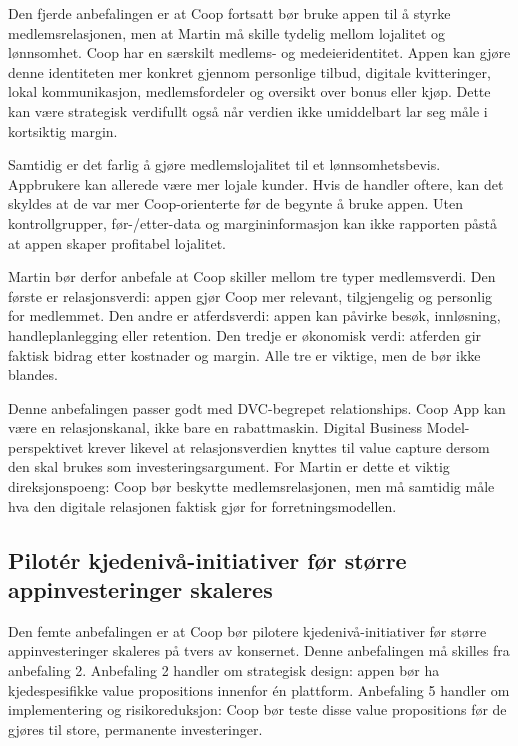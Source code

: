 \documentclass[12pt,a4paper]{article}
\begin{document}
Den fjerde anbefalingen er at Coop fortsatt bør bruke appen til å styrke medlemsrelasjonen, men at Martin må skille tydelig mellom lojalitet og lønnsomhet. Coop har en særskilt medlems- og medeieridentitet. Appen kan gjøre denne identiteten mer konkret gjennom personlige tilbud, digitale kvitteringer, lokal kommunikasjon, medlemsfordeler og oversikt over bonus eller kjøp. Dette kan være strategisk verdifullt også når verdien ikke umiddelbart lar seg måle i kortsiktig margin.

Samtidig er det farlig å gjøre medlemslojalitet til et lønnsomhetsbevis. Appbrukere kan allerede være mer lojale kunder. Hvis de handler oftere, kan det skyldes at de var mer Coop-orienterte før de begynte å bruke appen. Uten kontrollgrupper, før-/etter-data og margininformasjon kan ikke rapporten påstå at appen skaper profitabel lojalitet.

Martin bør derfor anbefale at Coop skiller mellom tre typer medlemsverdi. Den første er relasjonsverdi: appen gjør Coop mer relevant, tilgjengelig og personlig for medlemmet. Den andre er atferdsverdi: appen kan påvirke besøk, innløsning, handleplanlegging eller retention. Den tredje er økonomisk verdi: atferden gir faktisk bidrag etter kostnader og margin. Alle tre er viktige, men de bør ikke blandes.

Denne anbefalingen passer godt med DVC-begrepet relationships. Coop App kan være en relasjonskanal, ikke bare en rabattmaskin. Digital Business Model-perspektivet krever likevel at relasjonsverdien knyttes til value capture dersom den skal brukes som investeringsargument. For Martin er dette et viktig direksjonspoeng: Coop bør beskytte medlemsrelasjonen, men må samtidig måle hva den digitale relasjonen faktisk gjør for forretningsmodellen.

\subsection{Pilotér kjedenivå-initiativer før større appinvesteringer skaleres}

Den femte anbefalingen er at Coop bør pilotere kjedenivå-initiativer før større appinvesteringer skaleres på tvers av konsernet. Denne anbefalingen må skilles fra anbefaling 2. Anbefaling 2 handler om strategisk design: appen bør ha kjedespesifikke value propositions innenfor én plattform. Anbefaling 5 handler om implementering og risikoreduksjon: Coop bør teste disse value propositions før de gjøres til store, permanente investeringer.
\end{document}
